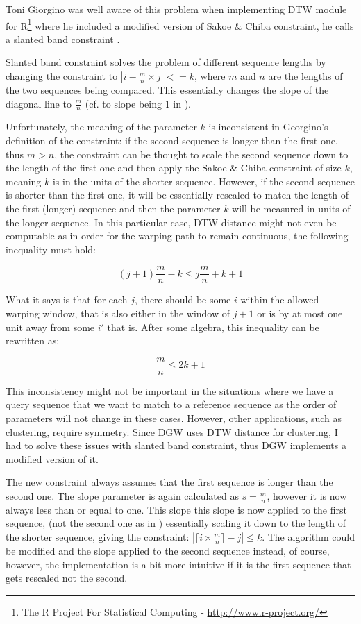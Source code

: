\documentclass[parskip]{cs4rep}
\begin{document}
Toni Giorgino \nocite{Giorgino:2009ue} was well aware of this problem when implementing DTW module for R\footnote{The R Project For Statistical Computing - \url{http://www.r-project.org/}} where he included a modified version of Sakoe \& Chiba constraint, he calls a slanted band constraint \citep{Giorgino:2009ue}. 

Slanted band constraint solves the problem of different sequence lengths by changing the constraint to 
$|i - \frac{m}{n} \times j| <= k$, where $m$ and $n$ are the lengths of the two sequences being compared. This essentially changes the slope of the diagonal line to $\frac{m}{n}$ (cf. to slope being 1 in \citep{Sakoe:1978ta}).

Unfortunately, the meaning of the parameter $k$ is inconsistent in Georgino's definition of the constraint: if the second sequence is longer than the first one, thus $m > n$, the constraint can be thought to scale the second sequence down to the length of the first one and then apply the Sakoe \& Chiba constraint of size $k$, meaning $k$ is in the units of the shorter sequence. However, if the second sequence is shorter than the first one, it will be essentially rescaled to match the length of the first (longer) sequence and then the parameter $k$ will be measured in units of the longer sequence. In this particular case, DTW distance might not even be computable as in order for the warping path to remain continuous, the following inequality must hold: 

$$(j+1) \frac{m}{n} - k \le j \frac{m}{n} + k + 1$$

What it says is that for each $j$, there should be some $i$ within the allowed warping window, that is also either in the window of $j+1$ or is by at most one unit away from some $i'$ that is. 
After some algebra, this inequality can be rewritten as:

$$\frac{m}{n} \le 2k + 1$$

This inconsistency might not be important in the situations where we have a query sequence that we want to match to a reference sequence as the order of parameters will not change in these cases. However, other applications, such as clustering, require symmetry. Since DGW uses DTW distance for clustering, I had to solve these issues with slanted band constraint, thus
DGW implements a modified version of it. 

The new constraint always assumes that the first sequence is longer than the second one. The slope parameter is again calculated as $s = \frac{m}{n}$, however it is now always less than or equal to one. This slope this slope is now applied to the first sequence, (not the second one as in \citep{Giorgino:2009ue}) essentially scaling it down to the length of the shorter sequence, giving the constraint: $|\lceil i \times \frac{m}{n} \rceil - j| \le k$. The algorithm could be modified and the slope applied to the second sequence instead, of course, however, the implementation is a bit more intuitive if it is the first sequence that gets rescaled not the second. 
\end{document}
